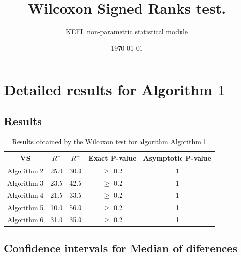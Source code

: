 \documentclass[a4paper,10pt]{article}
\title{Wilcoxon Signed Ranks test.}
\date{\today}
\author{KEEL non-parametric statistical module}
\begin{document}
\pagestyle{empty}
\maketitle
\thispagestyle{empty}



\section{Detailed results for Algorithm 1}


\subsection{Results}

\begin{table}[!htp]
\centering\small
\begin{tabular}{
|c|c|c|c|c|}
\hline
 VS & $R^{+}$ & $R^{-}$ & Exact P-value & Asymptotic P-value \\ \hline 
Algorithm 2 & 25.0 & 30.0 & $\geq$ 0.2 & 1\\ \hline 
Algorithm 3 & 23.5 & 42.5 & $\geq$ 0.2 & 1\\ \hline 
Algorithm 4 & 21.5 & 33.5 & $\geq$ 0.2 & 1\\ \hline 
Algorithm 5 & 10.0 & 56.0 & $\geq$ 0.2 & 1\\ \hline 
Algorithm 6 & 31.0 & 35.0 & $\geq$ 0.2 & 1\\ \hline 

\end{tabular}
\caption{Results obtained by the Wilcoxon test for algorithm Algorithm 1}
\end{table}

\subsection{Confidence intervals for Median of diferences}
\end{document}
